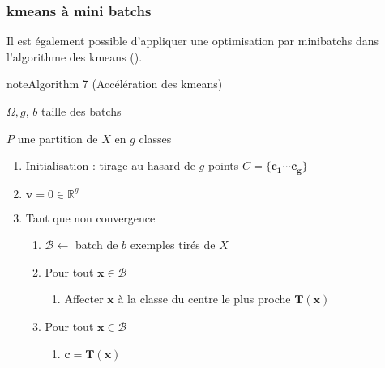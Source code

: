\documentclass[letterpaper,10pt,french]{sphinxmanual}
\begin{document}
\subsubsection{k\sphinxhyphen{}means à mini batchs}
\label{\detokenize{clustering:k-means-a-mini-batchs}}
\sphinxAtStartPar
Il est également possible d’appliquer une optimisation par mini\sphinxhyphen{}batchs dans l’algorithme des k\sphinxhyphen{}means ({\hyperref[\detokenize{clustering:kmbatch}]{}}).
\label{clustering:kmbatch}
\begin{sphinxadmonition}{note}{Algorithm 7 (Accélération des k\sphinxhyphen{}means)}



\sphinxAtStartPar
{} \(\Omega, g\), \(b\) taille des batchs

\sphinxAtStartPar
{} \(P\) une partition de \(X\) en \(g\) classes
\begin{enumerate}
%
\item {} 
\sphinxAtStartPar
Initialisation : tirage au hasard de \(g\) points \(C =\{\mathbf {c_1}\cdots \mathbf {c_g\}}\)

\item {} 
\sphinxAtStartPar
\(\mathbf v=0\in\mathbb{R}^g\)

\item {} 
\sphinxAtStartPar
Tant que non convergence
\begin{enumerate}
%
\item {} 
\sphinxAtStartPar
\(\mathcal{B}\leftarrow\) batch de \(b\) exemples tirés de \(X\)

\item {} 
\sphinxAtStartPar
Pour tout \(\mathbf x\in \mathcal{B}\)
\begin{enumerate}
%
\item {} 
\sphinxAtStartPar
Affecter \(\mathbf x\) à la classe du centre le plus proche \(\mathbf T(\mathbf x)\)

\end{enumerate}

\item {} 
\sphinxAtStartPar
Pour tout \(\mathbf x\in \mathcal{B}\)
\begin{enumerate}
%
\item {} 
\sphinxAtStartPar
\(\mathbf c = \mathbf T(\mathbf x)\)


\end{enumerate}
\end{enumerate}
\end{enumerate}
\end{sphinxadmonition}
\end{document}
